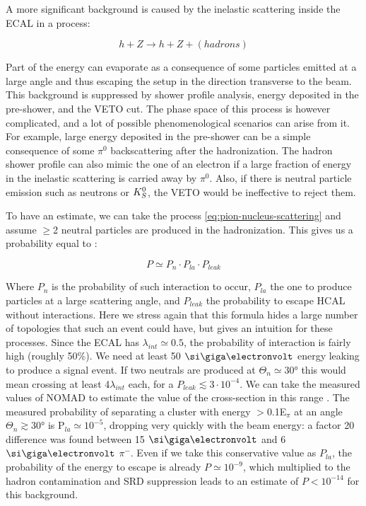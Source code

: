 A more significant background is caused by the inelastic scattering inside the ECAL in a process:

\begin{equation}
  \label{eq:pion-nucleus-scattering}
  h + Z \longrightarrow h + Z + (hadrons)
\end{equation}

Part of the energy can evaporate as a consequence of some particles emitted at a large angle and thus escaping the setup in the direction transverse to the beam. This background is suppressed by shower profile analysis, energy deposited in the pre-shower, and the VETO cut. The phase space of this process is however complicated, and a lot of possible phenomenological scenarios can arise from it. For example, large energy deposited in the pre-shower can be a simple consequence of some $\pi^0$ backscattering after the hadronization. The hadron shower profile can also mimic the one of an electron if a large fraction of energy in the inelastic scattering is carried away by $\pi^0$. Also, if there is neutral particle emission such as neutrons or $K^0_S$, the VETO would be ineffective to reject them.

To have an estimate, we can take the process \ref{eq:pion-nucleus-scattering} and assume $\geq$2 neutral particles are produced in the hadronization. This gives us a probability equal to \cite{gkkk1}:

\begin{equation}
  \label{eq:transverse-leak-estimate}
  P \simeq P_n \cdot P_{la} \cdot P_{leak}
\end{equation}

Where $P_n$ is the probability of such interaction to occur, $P_{la}$ the one to produce particles at a large scattering angle, and $P_{leak}$ the probability to escape HCAL without interactions. Here we stress again that this formula hides a large number of topologies that such an event could have, but gives an intuition for these processes. Since the ECAL has $\lambda_{int} \simeq 0.5$, the probability of interaction is fairly high (roughly 50\%). We need at least 50 $\gev$ energy leaking to produce a signal event. If two neutrals are produced at $\Theta_{n} \simeq 30$\si{\degree} this would mean crossing at least 4$\lambda_{int}$ each, for a $P_{leak} \lesssim 3 \cdot 10^{-4}$. We can take the measured values of NOMAD to estimate the value of the cross-section in this range \cite{AUTIERO1998285,GNINENKO1998583}. The measured probability of separating a cluster with energy $>$0.1E$_{\pi}$ at an angle $\Theta_{n} \gtrsim 30$\si{\degree} is P$_{la} \simeq 10^{-5}$, dropping very quickly with the beam energy: a factor 20 difference was found between 15 $\gev$ and 6 $\gev$ $\pi^-$. Even if we take this conservative value as $P_{la}$, the probability of the energy to escape is already $P\simeq 10^{-9}$, which multiplied to the hadron contamination and SRD suppression leads to an estimate of $P<10^{-14}$ for this background.

